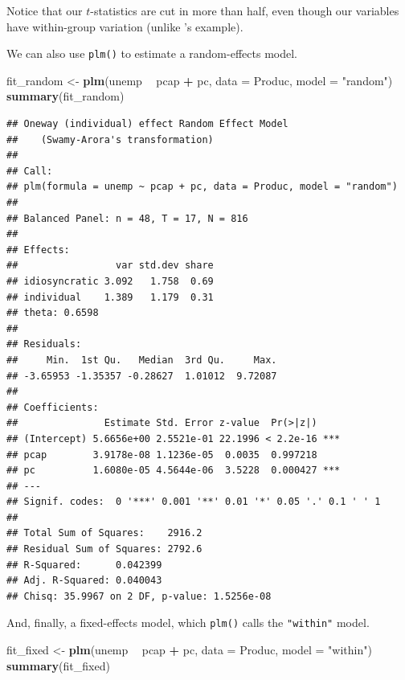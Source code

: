 \documentclass[12pt,oneside,openany]{book}
\newenvironment{Shaded}{\begin{snugshade}}{\end{snugshade}}
\newcommand{\KeywordTok}[1]{\textcolor[rgb]{0.13,0.29,0.53}{\textbf{#1}}}
\newcommand{\DataTypeTok}[1]{\textcolor[rgb]{0.13,0.29,0.53}{#1}}
\newcommand{\StringTok}[1]{\textcolor[rgb]{0.31,0.60,0.02}{#1}}
\newcommand{\OperatorTok}[1]{\textcolor[rgb]{0.81,0.36,0.00}{\textbf{#1}}}
\newcommand{\NormalTok}[1]{#1}
\begin{document}
Notice that our \(t\)-statistics are cut in more than half, even though
our variables have within-group variation (unlike
\citet{Moulton:1990bl}'s example).

We can also use \texttt{plm()} to estimate a random-effects model.

\begin{Shaded}
\begin{Highlighting}[]
\NormalTok{fit_random <-}\StringTok{ }\KeywordTok{plm}\NormalTok{(unemp }\OperatorTok{~}\StringTok{ }\NormalTok{pcap }\OperatorTok{+}\StringTok{ }\NormalTok{pc,}
                  \DataTypeTok{data =}\NormalTok{ Produc,}
                  \DataTypeTok{model =} \StringTok{"random"}\NormalTok{)}
\KeywordTok{summary}\NormalTok{(fit_random)}
\end{Highlighting}
\end{Shaded}

\begin{verbatim}
## Oneway (individual) effect Random Effect Model 
##    (Swamy-Arora's transformation)
## 
## Call:
## plm(formula = unemp ~ pcap + pc, data = Produc, model = "random")
## 
## Balanced Panel: n = 48, T = 17, N = 816
## 
## Effects:
##                 var std.dev share
## idiosyncratic 3.092   1.758  0.69
## individual    1.389   1.179  0.31
## theta: 0.6598
## 
## Residuals:
##     Min.  1st Qu.   Median  3rd Qu.     Max. 
## -3.65953 -1.35357 -0.28627  1.01012  9.72087 
## 
## Coefficients:
##               Estimate Std. Error z-value  Pr(>|z|)    
## (Intercept) 5.6656e+00 2.5521e-01 22.1996 < 2.2e-16 ***
## pcap        3.9178e-08 1.1236e-05  0.0035  0.997218    
## pc          1.6080e-05 4.5644e-06  3.5228  0.000427 ***
## ---
## Signif. codes:  0 '***' 0.001 '**' 0.01 '*' 0.05 '.' 0.1 ' ' 1
## 
## Total Sum of Squares:    2916.2
## Residual Sum of Squares: 2792.6
## R-Squared:      0.042399
## Adj. R-Squared: 0.040043
## Chisq: 35.9967 on 2 DF, p-value: 1.5256e-08
\end{verbatim}

And, finally, a fixed-effects model, which \texttt{plm()} calls the
\texttt{"within"} model.

\begin{Shaded}
\begin{Highlighting}[]
\NormalTok{fit_fixed <-}\StringTok{ }\KeywordTok{plm}\NormalTok{(unemp }\OperatorTok{~}\StringTok{ }\NormalTok{pcap }\OperatorTok{+}\StringTok{ }\NormalTok{pc,}
                 \DataTypeTok{data =}\NormalTok{ Produc,}
                 \DataTypeTok{model =} \StringTok{"within"}\NormalTok{)}
\KeywordTok{summary}\NormalTok{(fit_fixed)}
\end{Highlighting}
\end{Shaded}
\end{document}
